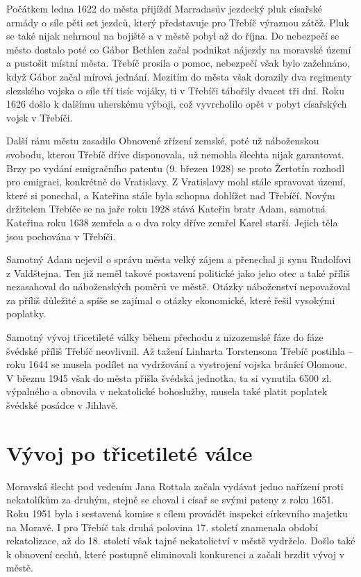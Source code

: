 \documentclass[a4paper,oneside,12p]{report}
\begin{document}
Počátkem ledna 1622 do města přijíždí Marradasův jezdecký pluk císařské armády o síle pěti set jezdců, který představuje pro Třebíč výraznou zátěž. %
Pluk se také nijak nehrnoul na bojiště a v městě pobyl až do října.
Do nebezpečí se město dostalo poté co Gábor Bethlen začal podnikat nájezdy na moravské území a pustošit místní města.
Třebíč prosila o pomoc, nebezpečí však bylo zažehnáno, když Gábor začal mírová jednání.
Mezitím do města však dorazily dva regimenty slezského vojska o síle tří tisíc vojáky, ti v Třebíči tábořily dvacet tři dní.
Roku 1626 došlo k dalšímu uherskému výboji, což vyvrcholilo opět v pobyt císařských vojsk v Třebíči. %

Další ránu městu zasadilo Obnovené zřízení zemské, poté už náboženskou svobodu, kterou Třebíč dříve disponovala, už nemohla šlechta nijak garantovat.
Brzy po vydání emigračního patentu (9. březen 1928) se proto Žertotín rozhodl pro emigraci, konkrétně do Vratislavy.
Z Vratislavy mohl stále spravovat území, které si ponechal, a Kateřina stále byla schopna dohlížet nad Třebíčí.
Novým držitelem Třebíče se na jaře roku 1928 stává Kateřin bratr Adam, samotná Kateřina roku 1638 zemřela a o dva roky dříve zemřel Karel starší. %
Jejich těla jsou pochována v Třebíči. %

Samotný Adam nejevil o správu města velký zájem a přenechal ji synu Rudolfovi z Valdštejna.
Ten již neměl takové postavení politické jako jeho otec a také příliš nezasahoval do náboženských poměrů ve městě.
Otázky náboženství nepovažoval za příliš důležité a spíše se zajímal o otázky ekonomické, které řešil vysokými poplatky. %

Samotný vývoj třicetileté války během přechodu z nizozemské fáze do fáze švédské příliš Třebíč neovlivnil.
Až tažení Linharta Torstensona Třebíč postihla -- roku 1644 se musela podílet na vydržování a vystrojení vojska bránící Olomouc.
V březnu 1945 však do města přišla švédská jednotka, ta si vynutila 6500 zl. výpalného a obnovila v nekatolické bohoslužby, musela také platit poplatek švédské posádce v Jihlavě. %

\section{Vývoj po třicetileté válce}

Moravská šlecht pod vedením Jana Rottala začala vydávat jedno nařízení proti nekatolíkům za druhým, stejně se choval i císař se svými pateny z roku 1651.
Roku 1951 byla i sestavená komise s cílem provádět inspekci církevního majetku na Moravě.
I pro Třebíč tak druhá polovina 17. století znamenala období rekatolizace, až do 18. století však tajné nekatolictví v městě vydrželo.
Došlo také k obnovení cechů, které postupně eliminovali konkurenci a začali brzdit vývoj v městě. %
\end{document}
